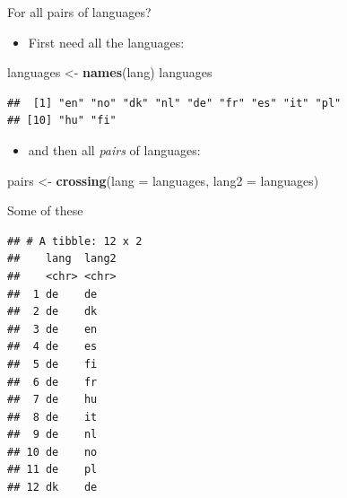 \documentclass[
  ignorenonframetext,
]{beamer}
\newenvironment{Shaded}{\begin{snugshade}}{\end{snugshade}}
\newcommand{\DataTypeTok}[1]{\textcolor[rgb]{0.13,0.29,0.53}{#1}}
\newcommand{\DecValTok}[1]{\textcolor[rgb]{0.00,0.00,0.81}{#1}}
\newcommand{\KeywordTok}[1]{\textcolor[rgb]{0.13,0.29,0.53}{\textbf{#1}}}
\newcommand{\NormalTok}[1]{#1}
\newcommand{\OperatorTok}[1]{\textcolor[rgb]{0.81,0.36,0.00}{\textbf{#1}}}
\newcommand{\StringTok}[1]{\textcolor[rgb]{0.31,0.60,0.02}{#1}}
\providecommand{\tightlist}{%
  \setlength{\itemsep}{0pt}\setlength{\parskip}{0pt}}
\begin{document}
\begin{frame}[fragile]{For all pairs of languages?}
\protect\hypertarget{for-all-pairs-of-languages}{}

\begin{itemize}
\tightlist
\item
  First need all the languages:
\end{itemize}

\begin{Shaded}
\begin{Highlighting}[]
\NormalTok{languages <-}\StringTok{ }\KeywordTok{names}\NormalTok{(lang)}
\NormalTok{languages}
\end{Highlighting}
\end{Shaded}

\begin{verbatim}
##  [1] "en" "no" "dk" "nl" "de" "fr" "es" "it" "pl"
## [10] "hu" "fi"
\end{verbatim}

\begin{itemize}
\tightlist
\item
  and then all \emph{pairs} of languages:
\end{itemize}

\begin{Shaded}
\begin{Highlighting}[]
\NormalTok{pairs <-}\StringTok{ }\KeywordTok{crossing}\NormalTok{(}\DataTypeTok{lang =}\NormalTok{ languages, }\DataTypeTok{lang2 =}\NormalTok{ languages) }
\end{Highlighting}
\end{Shaded}

\end{frame}

\begin{frame}[fragile]{Some of these}
\protect\hypertarget{some-of-these}{}

\scriptsize

\begin{Shaded}
\end{Shaded}

\begin{verbatim}
## # A tibble: 12 x 2
##    lang  lang2
##    <chr> <chr>
##  1 de    de   
##  2 de    dk   
##  3 de    en   
##  4 de    es   
##  5 de    fi   
##  6 de    fr   
##  7 de    hu   
##  8 de    it   
##  9 de    nl   
## 10 de    no   
## 11 de    pl   
## 12 dk    de
\end{verbatim}

\normalsize

\end{frame}
\end{document}
